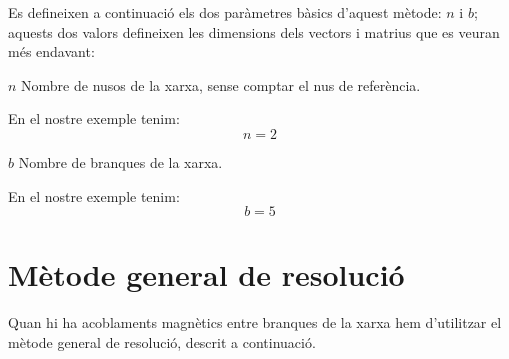 Es defineixen a continuació els dos
paràmetres bàsics d'aquest mètode: $n$ i $b$; aquests dos valors
defineixen les dimensions dels vectors i matrius que es veuran més
endavant:
\begin{list}{}
   {\setlength{\labelwidth}{7mm} \setlength{\leftmargin}{9mm} \setlength{\labelsep}{2mm}}
   \item[$n$] Nombre de nusos de la xarxa, sense comptar el nus de referència.

   En el nostre exemple tenim:
   \[ n=2 \]

   \item[$b$] Nombre de branques de la xarxa.

   En el nostre exemple tenim:
   \[ b=5 \]
\end{list}

\section{Mètode general de resolució}\label{sec:xarxes-metode-general}

Quan hi ha acoblaments
magnètics entre branques de la xarxa hem d'utilitzar el mètode
general de resolució, descrit a continuació.

